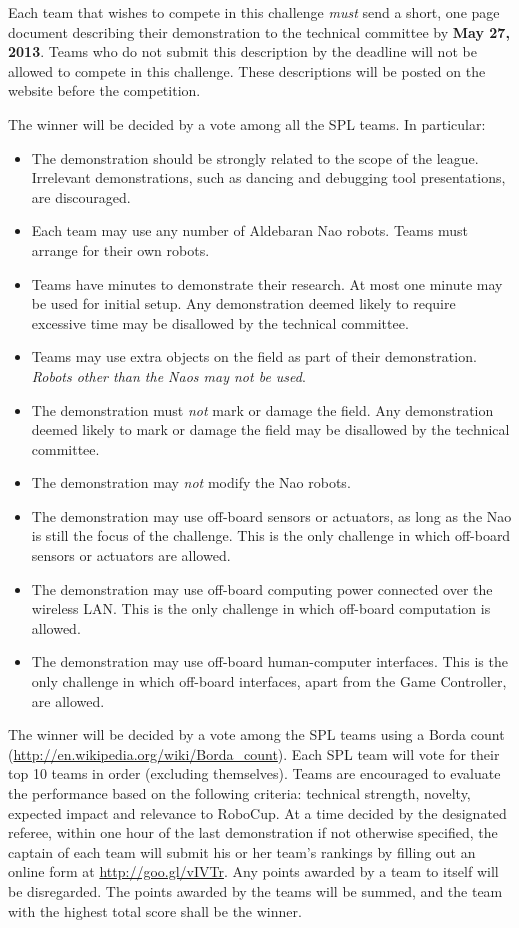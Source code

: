 \documentclass{article}
\begin{document}
Each team that wishes to compete in this challenge \emph{must} send a 
short, one page document describing their demonstration to the technical 
committee by \textbf{May 27, 2013}.  Teams who do not submit this description by 
the deadline will not be allowed to compete in this challenge. These 
descriptions will be posted on the website before the competition.

The winner will be decided by a vote among all the SPL teams. In particular:

\begin{itemize}
\item 
The demonstration should be strongly related to the scope of the league. 
Irrelevant demonstrations, such as dancing and debugging tool presentations, 
are discouraged.
\item 
Each team may use any number of Aldebaran Nao robots. Teams must arrange
for their own robots.
\item 
Teams have \openMinNum{} minutes to demonstrate their research. At most one 
minute may be used for initial setup. Any demonstration deemed
likely to require excessive time may be disallowed by the technical
committee.
\item 
Teams may use extra objects on the field as part of their
demonstration. \emph{Robots other than the Naos may not be used}.
\item 
The demonstration must \emph{not} mark or damage the field. Any
demonstration deemed likely to mark or damage the field may be
disallowed by the technical committee.
\item
The demonstration may \emph{not} modify the Nao robots.
\item 
The demonstration may use off-board sensors or actuators, as long 
as the Nao is still the focus of the challenge.  This is the only 
challenge in which off-board sensors or actuators are allowed.
\item 
The demonstration may use off-board computing power connected over the
wireless LAN. This is the only challenge in which off-board
computation is allowed.
\item 
The demonstration may use off-board human-computer interfaces. This
is the only challenge in which off-board interfaces, apart from the
Game Controller, are allowed.
\end{itemize}

The winner will be decided by a vote among the SPL teams using a Borda
count (\url{http://en.wikipedia.org/wiki/Borda_count}). Each SPL 
team will vote for their top 10 teams in order (excluding themselves).
Teams are encouraged to evaluate the performance based on the
following criteria: technical strength, novelty, expected impact and
relevance to RoboCup. At a time decided by the designated referee,
within one hour of the last demonstration if not otherwise
specified, the captain of each team will submit his or her team's rankings 
by filling out an online form at \url{http://goo.gl/vIVTr}.  Any points 
awarded by a team to itself will be disregarded. The points awarded by the 
teams will be summed, and the team with the highest total score shall be the winner.
\end{document}

